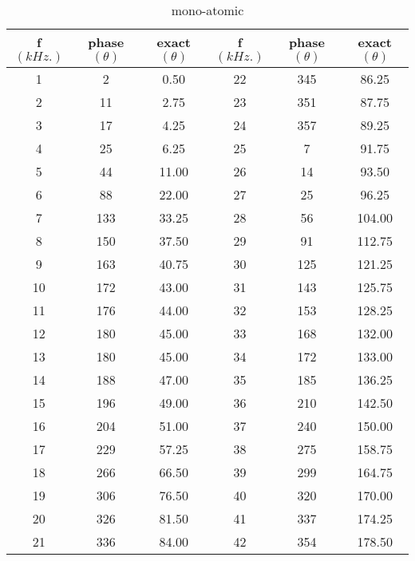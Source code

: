 \begin{table}[h]
	\centering
	\caption{mono-atomic}
	\label{tabal}
	\begin{tabular}{|c|c|c||c|c|c|}
f$(kHz.)$  & phase$(\theta)$& exact$(\theta)$ &f$(kHz.)$  & phase$(\theta)$& exact$(\theta)$ \\ \hline
1   & 2    & 0.50        & 22  & 345  & 86.25       \\
2   & 11   & 2.75        & 23  & 351  & 87.75       \\
3   & 17   & 4.25        & 24  & 357  & 89.25       \\
4   & 25   & 6.25        & 25  & 7    & 91.75       \\
5   & 44   & 11.00       & 26  & 14   & 93.50       \\
6   & 88   & 22.00       & 27  & 25   & 96.25       \\
7   & 133  & 33.25       & 28  & 56   & 104.00      \\
8   & 150  & 37.50       & 29  & 91   & 112.75      \\
9   & 163  & 40.75       & 30  & 125  & 121.25      \\
10  & 172  & 43.00       & 31  & 143  & 125.75      \\
11  & 176  & 44.00       & 32  & 153  & 128.25      \\
12  & 180  & 45.00       & 33  & 168  & 132.00      \\
13  & 180  & 45.00       & 34  & 172  & 133.00      \\
14  & 188  & 47.00       & 35  & 185  & 136.25      \\
15  & 196  & 49.00       & 36  & 210  & 142.50      \\
16  & 204  & 51.00       & 37  & 240  & 150.00      \\
17  & 229  & 57.25       & 38  & 275  & 158.75      \\
18  & 266  & 66.50       & 39  & 299  & 164.75      \\
19  & 306  & 76.50       & 40  & 320  & 170.00      \\
20  & 326  & 81.50       & 41  & 337  & 174.25      \\
21  & 336  & 84.00       & 42  & 354  & 178.50      \\
	\end{tabular}
\end{table}

